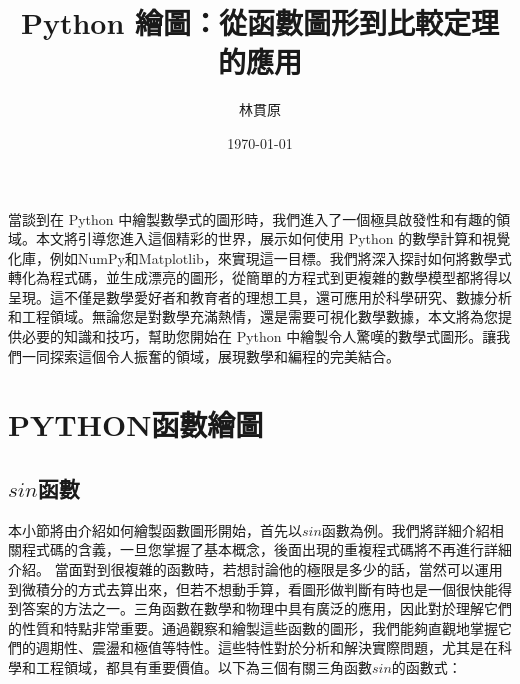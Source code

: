 \documentclass[12pt, a4paper]{article}
\title{\textbf{Python} 繪圖：從函數圖形到比較定理的應用}
\author{{\KT 林貫原}}
\date{{\R \today }}
\begin{document}
\renewcommand{\tablename}{表}	
\renewcommand{\figurename}{圖}
\maketitle
\fontsize{12}{22pt}\selectfont 

當談到在 Python 中繪製數學式的圖形時，我們進入了一個極具啟發性和有趣的領域。本文將引導您進入這個精彩的世界，展示如何使用 Python 的數學計算和視覺化庫，例如NumPy和Matplotlib，來實現這一目標。我們將深入探討如何將數學式轉化為程式碼，並生成漂亮的圖形，從簡單的方程式到更複雜的數學模型都將得以呈現。這不僅是數學愛好者和教育者的理想工具，還可應用於科學研究、數據分析和工程領域。無論您是對數學充滿熱情，還是需要可視化數學數據，本文將為您提供必要的知識和技巧，幫助您開始在 Python 中繪製令人驚嘆的數學式圖形。讓我們一同探索這個令人振奮的領域，展現數學和編程的完美結合。
\section{PYTHON函數繪圖}
\subsection{$sin$函數}
本小節將由介紹如何繪製函數圖形開始，首先以$sin$函數為例。我們將詳細介紹相關程式碼的含義，一旦您掌握了基本概念，後面出現的重複程式碼將不再進行詳細介紹。
當面對到很複雜的函數時，若想討論他的極限是多少的話，當然可以運用到微積分的方式去算出來，但若不想動手算，看圖形做判斷有時也是一個很快能得到答案的方法之一。三角函數在數學和物理中具有廣泛的應用，因此對於理解它們的性質和特點非常重要。通過觀察和繪製這些函數的圖形，我們能夠直觀地掌握它們的週期性、震盪和極值等特性。這些特性對於分析和解決實際問題，尤其是在科學和工程領域，都具有重要價值。以下為三個有關三角函數$sin$的函數式：
\end{document}
